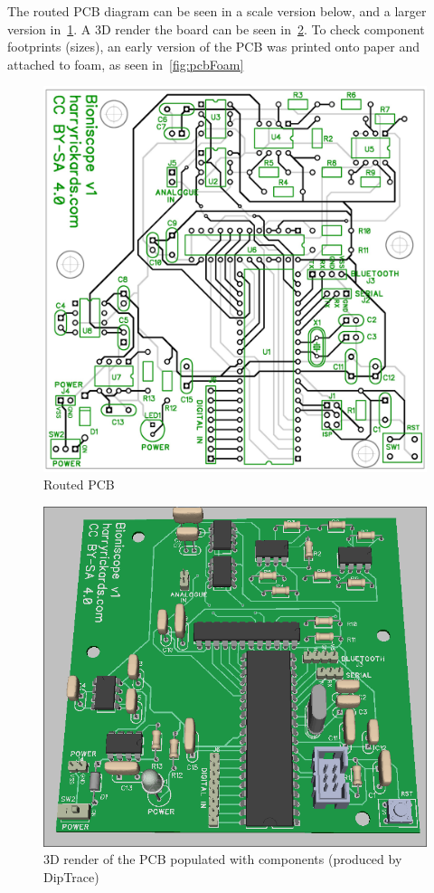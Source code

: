 The routed PCB diagram can be seen in a scale version below, and a larger
version in~\cref{fig:largePCBDiagram}. A 3D render the board can be seen
in~\cref{fig:pcb3DRender}. To check component footprints (sizes), an early
version of the PCB was printed onto paper and attached to foam, as seen
in~\cref{fig:pcbFoam}



\begin{figure}[H]
  \includegraphics[width=\linewidth]{img/pcb/pcbBig.png}
  \caption[PCB (traces)]{Routed PCB}
  \label{fig:largePCBDiagram}
\end{figure}

\begin{figure}[H]
  \includegraphics[width=\linewidth]{img/pcb/pcb3D.png}
  \caption[PCB (3D render)]{3D render of the PCB populated with components (produced by DipTrace)}
  \label{fig:pcb3DRender}
\end{figure}

